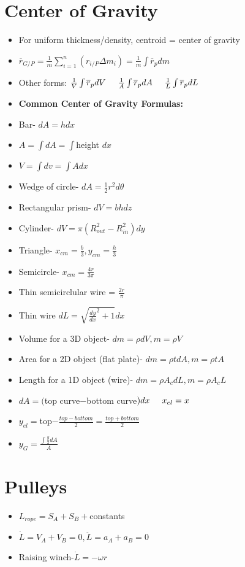 \documentclass [10pt] {article}
\begin{document}
\begin{multicols*}{2}
\section{Center of Gravity}
	\begin{itemize}
		\item For uniform thickness/density, centroid = center of gravity
		\item $\overline{r}_{G/P} = \frac{1}{m}\sum\limits_{i = 1}^{n}{(r_{i/P}\Delta{m_i})} = \frac{1}{m}\int{\overline{r}_p}dm $
		\item Other forms: $\frac{1}{V}\int{\overline{r}_p}dV \hspace{5mm} \frac{1}{A}\int{\overline{r}_p}dA \hspace{5mm} \frac{1}{L}\int{\overline{r}_p}dL $ 
		\item \textbf{Common Center of Gravity Formulas:}
		\item Bar- $dA = h dx$ 
		\item $A = \int dA = \int $height $ dx  $
		\item $V = \int{dv} = \int{A dx}$
		\item Wedge of circle- $dA = \frac{1}{2}r^2d\theta$ 
		\item Rectangular prism- $dV = bh dz$
		\item Cylinder- $dV = \pi(R_{out}^2 - R_{in}^2)dy$ 
		\item Triangle- $x_{cm} = \frac{b}{3}, y_{cm} = \frac{h}{3}$ 
		\item Semicircle- $x_{cm} = \frac{4r}{3\pi}$ \
		\item Thin semicirclular wire = $\frac{2r}{\pi}$  
		\item Thin wire \hspace{3mm} $dL = \sqrt{\frac{dy}{dx}^2 + 1}dx $
		\item Volume for a 3D object- $dm = \rho dV, m = \rho V$ 
		\item Area for a 2D object (flat plate)- $dm = \rho tdA, m = \rho tA $
		\item Length for a 1D object (wire)- $dm = \rho A_cdL, m = \rho A_cL$
		\item $dA = ($top curve$ - $bottom curve$)dx \hspace{5mm} x_{el} = x$
		\item $y_{el} = $top$ - \frac{top - bottom}{2} = \frac{top + bottom}{2} $
		\item $y_G = \frac{\int \frac{y}{2}dA}{A}$
	\end{itemize}
\section{Pulleys}
	\begin{itemize}
		\item $L_{rope} = S_A + S_B + $constants
		\item $\dot{L} = V_A + V_B = 0, \ddot{L} = a_A + a_B = 0 $
		\item Raising winch-$ \dot{L} = -\omega r$ 
	\end{itemize}

\end{multicols*}
\end{document}
